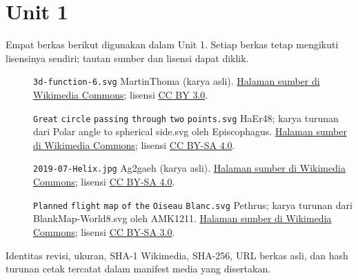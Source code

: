\section*{Unit 1}
Empat berkas berikut digunakan dalam Unit 1. Setiap berkas tetap mengikuti lisensinya sendiri; tautan sumber dan lisensi dapat diklik.
\begin{description}
\item[]\texttt{3d-function-6.svg}
MartinThoma (karya asli).
\href{https://commons.wikimedia.org/wiki/File:3d-function-6.svg}{Halaman sumber di Wikimedia Commons}; lisensi \href{https://creativecommons.org/licenses/by/3.0}{CC BY 3.0}.
\item[]\texttt{Great} \texttt{circle} \texttt{passing} \texttt{through} \texttt{two} \texttt{points.svg}
HaEr48; karya turunan dari Polar angle to spherical side.svg oleh Episcophagus.
\href{https://commons.wikimedia.org/wiki/File:Great_circle_passing_through_two_points.svg}{Halaman sumber di Wikimedia Commons}; lisensi \href{https://creativecommons.org/licenses/by-sa/4.0}{CC BY-SA 4.0}.
\item[]\texttt{2019-07-Helix.jpg}
Ag2gaeh (karya asli).
\href{https://commons.wikimedia.org/wiki/File:2019-07-Helix.jpg}{Halaman sumber di Wikimedia Commons}; lisensi \href{https://creativecommons.org/licenses/by-sa/4.0}{CC BY-SA 4.0}.
\item[]\texttt{Planned} \texttt{flight} \texttt{map} \texttt{of} \texttt{the} \texttt{Oiseau} \texttt{Blanc.svg}
Pethrus; karya turunan dari BlankMap-World8.svg oleh AMK1211.
\href{https://commons.wikimedia.org/wiki/File:Planned_flight_map_of_the_Oiseau_Blanc.svg}{Halaman sumber di Wikimedia Commons}; lisensi \href{https://creativecommons.org/licenses/by-sa/3.0}{CC BY-SA 3.0}.
\end{description}
Identitas revisi, ukuran, SHA-1 Wikimedia, SHA-256, URL berkas asli, dan hash turunan cetak tercatat dalam manifest media yang disertakan.
